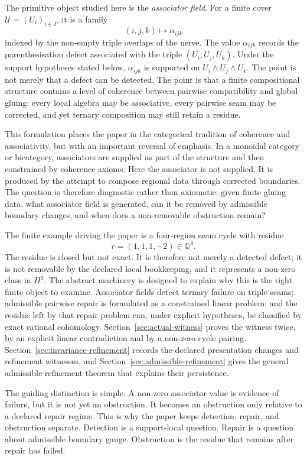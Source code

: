 \documentclass[11pt]{article}
\newcommand{\Q}{\mathbb{Q}}
\begin{document}
The primitive object studied here is the \emph{associator field}. For a finite cover \(\mathcal U=(U_i)_{i\in I}\), it is a family
\[
(i,j,k)\longmapsto \alpha_{ijk}
\]
indexed by the non-empty triple overlaps of the nerve. The value \(\alpha_{ijk}\) records the parenthesisation defect associated with the triple \((U_i,U_j,U_k)\). Under the support hypotheses stated below, \(\alpha_{ijk}\) is supported on \(U_i\wedge U_j\wedge U_k\). The point is not merely that a defect can be detected. The point is that a finite compositional structure contains a level of coherence between pairwise compatibility and global gluing: every local algebra may be associative, every pairwise seam may be corrected, and yet ternary composition may still retain a residue.

This formulation places the paper in the categorical tradition of coherence and associativity, but with an important reversal of emphasis. In a monoidal category or bicategory, associators are supplied as part of the structure and then constrained by coherence axioms. Here the associator is not supplied. It is produced by the attempt to compose regional data through corrected boundaries. The question is therefore diagnostic rather than axiomatic: given finite gluing data, what associator field is generated, can it be removed by admissible boundary changes, and when does a non-removable obstruction remain?

The finite example driving the paper is a four-region seam cycle with residue
\[
r=(1,1,1,-2)\in\Q^4 .
\]
The residue is closed but not exact. It is therefore not merely a detected defect; it is not removable by the declared local bookkeeping, and it represents a non-zero class in \(H^1\). The abstract machinery is designed to explain why this is the right finite object to examine. Associator fields detect ternary failure on triple seams; admissible pairwise repair is formulated as a constrained linear problem; and the residue left by that repair problem can, under explicit hypotheses, be classified by exact rational cohomology. Section~\ref{sec:actual-witness} proves the witness twice, by an explicit linear contradiction and by a non-zero cycle pairing. Section~\ref{sec:invariance-refinement} records the declared presentation changes and refinement witnesses, and Section~\ref{sec:admissible-refinement} gives the general admissible-refinement theorem that explains their persistence.

The guiding distinction is simple. A non-zero associator value is evidence of failure, but it is not yet an obstruction. It becomes an obstruction only relative to a declared repair regime. This is why the paper keeps detection, repair, and obstruction separate. Detection is a support-local question. Repair is a question about admissible boundary gauge. Obstruction is the residue that remains after repair has failed.
\end{document}
